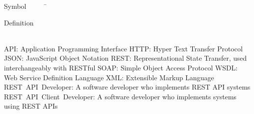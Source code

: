 

\begin{tabbing}
Symbol~~~~~\= \ \ \ \ \ \ \ \ \ \ \ \ \ \ \ \ \ \ \ \ \ \ \ \ \ \ \ \ \ \ \ \ \ \ \ \  \parbox{5in}{Definition}\\

\addsymbol \mbox{API}: {Application Programming Interface}
\addsymbol \mbox{HTTP}: {Hyper Text Transfer Protocol}
\addsymbol \mbox{JSON}: {JavaScript Object Notation}
\addsymbol \mbox{REST}: {Representational State Transfer, used interchangeably with RESTful}
\addsymbol \mbox{SOAP}: {Simple Object Access Protocol}
\addsymbol \mbox{WSDL}: {Web Service Definition Language}
\addsymbol \mbox{XML}: {Extensible Markup Language}
\addsymbol \mbox{REST API Developer}: {A software developer who implements REST API systems}
\addsymbol \mbox{REST API Client Developer}: {A software developer who implements systems using REST APIs}





\end{tabbing}
